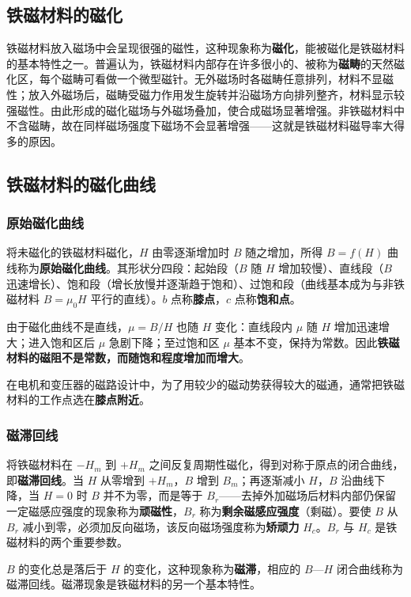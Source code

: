 \subsection{铁磁材料的磁化}
铁磁材料放入磁场中会呈现很强的磁性，这种现象称为\textbf{磁化}，能被磁化是铁磁材料的基本特性之一。普遍认为，铁磁材料内部存在许多很小的、被称为\textbf{磁畴}的天然磁化区，每个磁畴可看做一个微型磁针。无外磁场时各磁畴任意排列，材料不显磁性；放入外磁场后，磁畴受磁力作用发生旋转并沿磁场方向排列整齐，材料显示较强磁性。由此形成的磁化磁场与外磁场叠加，使合成磁场显著增强。非铁磁材料中不含磁畴，故在同样磁场强度下磁场不会显著增强——这就是铁磁材料磁导率大得多的原因。

\subsection{铁磁材料的磁化曲线}

\subsubsection{原始磁化曲线}
将未磁化的铁磁材料磁化，$H$ 由零逐渐增加时 $B$ 随之增加，所得 $B=f(H)$ 曲线称为\textbf{原始磁化曲线}。其形状分四段：起始段（$B$ 随 $H$ 增加较慢）、直线段（$B$ 迅速增长）、饱和段（增长放慢并逐渐趋于饱和）、过饱和段（曲线基本成为与非铁磁材料 $B=\mu_0H$ 平行的直线）。$b$ 点称\textbf{膝点}，$c$ 点称\textbf{饱和点}。

由于磁化曲线不是直线，$\mu=B/H$ 也随 $H$ 变化：直线段内 $\mu$ 随 $H$ 增加迅速增大；进入饱和区后 $\mu$ 急剧下降；至过饱和区 $\mu$ 基本不变，保持为常数。因此\textbf{铁磁材料的磁阻不是常数，而随饱和程度增加而增大}。

在电机和变压器的磁路设计中，为了用较少的磁动势获得较大的磁通，通常把铁磁材料的工作点选在\textbf{膝点附近}。

\subsubsection{磁滞回线}
将铁磁材料在 $-H_m$ 到 $+H_m$ 之间反复周期性磁化，得到对称于原点的闭合曲线，即\textbf{磁滞回线}。当 $H$ 从零增到 $+H_m$，$B$ 增到 $B_m$；再逐渐减小 $H$，$B$ 沿曲线下降，当 $H=0$ 时 $B$ 并不为零，而是等于 $B_r$——去掉外加磁场后材料内部仍保留一定磁感应强度的现象称为\textbf{顽磁性}，$B_r$ 称为\textbf{剩余磁感应强度}（剩磁）。要使 $B$ 从 $B_r$ 减小到零，必须加反向磁场，该反向磁场强度称为\textbf{矫顽力} $H_c$。$B_r$ 与 $H_c$ 是铁磁材料的两个重要参数。

$B$ 的变化总是落后于 $H$ 的变化，这种现象称为\textbf{磁滞}，相应的 $B$—$H$ 闭合曲线称为磁滞回线。磁滞现象是铁磁材料的另一个基本特性。

